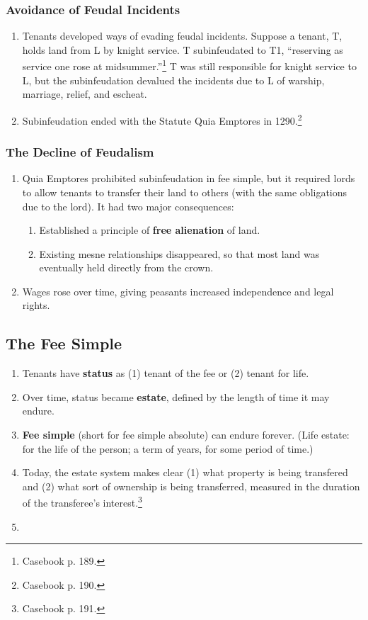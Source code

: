 \subsubsection{Avoidance of Feudal Incidents}

\begin{enumerate}
    \item Tenants developed ways of evading feudal incidents. Suppose a 
    tenant, T, holds land from L by knight service. T subinfeudated to T1, 
    ``reserving as service one rose at midsummer.''\footnote{Casebook p. 189.} 
    T was still responsible for knight service to L, but the subinfeudation 
    devalued the incidents due to L of warship, marriage, relief, and 
    escheat.
    \item Subinfeudation ended with the Statute Quia Emptores in 
    1290.\footnote{Casebook p. 190.}
\end{enumerate}

\subsubsection{The Decline of Feudalism}

\begin{enumerate}
    \item Quia Emptores prohibited subinfeudation in fee simple, but it 
    required lords to allow tenants to transfer their land to others (with the 
    same obligations due to the lord). It had two major consequences:
    \begin{enumerate}
        \item Established a principle of \textbf{free alienation} of land.
        \item Existing mesne relationships disappeared, so that most land was 
        eventually held directly from the crown.
    \end{enumerate}
    \item Wages rose over time, giving peasants increased independence and 
    legal rights.
\end{enumerate}

\subsection{The Fee Simple}

\begin{enumerate}
    \item Tenants have \textbf{status} as (1) tenant of the fee or (2) tenant 
    for life.
    \item Over time, status became \textbf{estate}, defined by the length of 
    time it may endure.
    \item \textbf{Fee simple} (short for fee simple absolute) can endure 
    forever. (Life estate: for the life of the person; a term of years, for 
    some period of time.)
    \item Today, the estate system makes clear (1) what property is being 
    transfered and (2) what sort of ownership is being transferred, measured 
    in the duration of the transferee's interest.\footnote{Casebook p. 191.}
    \item 
\end{enumerate}

